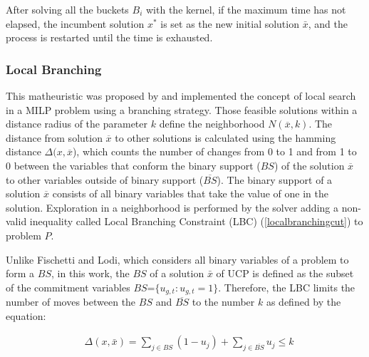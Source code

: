 After solving all the buckets $B_i$ with the kernel, if the maximum time has not elapsed, the incumbent solution $x^*$ is set as the new initial solution $\bar{x}$, and the process is restarted until the time is exhausted.



\subsubsection*{Local Branching}

This matheuristic was proposed by \citet{Fischetti2003} and implemented the concept of local search in a MILP problem using a branching strategy. Those feasible solutions within a distance radius of the parameter $k$ define the neighborhood $N(\overline{x},k)$. The distance from solution $\overline{x}$ to other solutions is calculated using the hamming distance $\Delta(x,\overline{x}$), which counts the number of changes from 0 to 1 and from 1 to 0 between the variables that conform the binary support ($\textit{BS}$) of the solution $\overline{x}$ to other variables outside of binary support  ($\overline{BS}$). The binary support of a solution $\overline{x}$ consists of all binary variables that take the value of one in the solution. Exploration in a neighborhood is performed by the solver adding a non-valid inequality called Local Branching Constraint (LBC) (\ref{localbranchingcut}) to problem $P$.

Unlike Fischetti and Lodi, which considers all binary variables of a problem to form a $\textit{BS}$, in this work, the $\textit{BS}$ of a solution $\bar{x}$ of UCP is defined as the subset of the commitment variables {$\textit{BS}$}=$\{u_{g,t}:u_{g,t}=1\}$.
Therefore, the LBC limits the number of moves between the $\textit{BS}$ and $\overline{\textit{BS}}$ to the number $k$ as defined by the equation:

\begin{align}
&  \Delta(x,\bar{x}) = \sum\limits_{j\in\textit{BS}} (1-u_{j}) + \sum\limits_{j\in{\overline{\textit{BS}}}} u_{j} \leq k \label{localbranchingcut}
\end{align}


